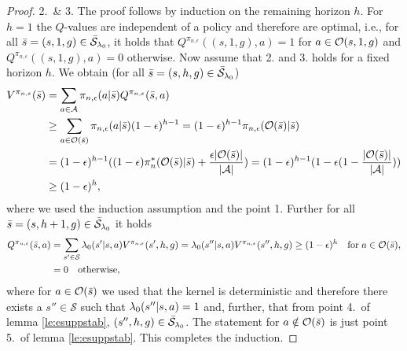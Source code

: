 \begin{proof}
2.\ \& 3.
The proof follows by induction on the remaining horizon $h$.
For $h=1$ the $Q$-values are independent of a policy
and therefore are optimal, i.e., for all 
$\bar{s} = (s,1,g) \in \bar{\mathcal{S}}_{\mathit{\lambda}_0}$, it holds that
$Q^{\pi_{n,\epsilon}}((s,1,g),a) = 1$ for $a\in \mathcal{O}(s,1,g)$
and $Q^{\pi_{n,\epsilon}}((s,1,g),a) = 0$ otherwise.
Now assume that 2. and 3. holds for a fixed horizon $h$.
We obtain (for all $\bar{s} = (s,h,g) \in \bar{\mathcal{S}}_{\mathit{\lambda}_0}$)
\begin{align*}
V^{\pi_{n,\epsilon}}(\bar{s})
&=
\sum_{a\in \mathcal{A}} \pi_{n,\epsilon}(a|\bar{s})
Q^{\pi_{n,\epsilon}}(\bar{s},a)
\\
&\geq
\sum_{a\in \mathcal{O}(\bar{s})} \pi_{n,\epsilon}(a|\bar{s})
(1-\epsilon)^{h-1}
=
(1-\epsilon)^{h-1} \pi_{n,\epsilon}(\mathcal{O}(\bar{s})|\bar{s})
\\
&=
(1-\epsilon)^{h-1} ((1-\epsilon) \pi_n^*(\mathcal{O}(\bar{s})|\bar{s})
+\frac{\epsilon |\mathcal{O}(\bar{s})|}{|\mathcal{A}|})
=
(1-\epsilon)^{h-1} (1-\epsilon(1-\frac{|\mathcal{O}(\bar{s})|}{|\mathcal{A}|}) )
\\
&\geq
(1-\epsilon)^{h},
\end{align*}
where we used the induction assumption and the point 1.
Further for all $\bar{s} = (s,h+1,g) \in \bar{\mathcal{S}}_{\mathit{\lambda}_0}$ it holds
\begin{align*}
Q^{\pi_{n,\epsilon}}(\bar{s},a)
&=
\sum_{s'\in \mathcal{S}} \mathit{\lambda}_0(s'|s,a)
V^{\pi_{n,\epsilon}}(s',h,g)
=
\mathit{\lambda}_0(s''|s,a)
V^{\pi_{n,\epsilon}}(s'',h,g) \geq (1-\epsilon)^{h} \quad \text{for}\; a \in \mathcal{O}(\bar{s}),
\\
&= 0 \quad \text{otherwise,}
\end{align*}
where for $a\in \mathcal{O}(\bar{s})$ we used that the kernel
is deterministic and therefore there exists a $s'' \in \mathcal{S}$
such that $\mathit{\lambda}_0(s''|s,a)=1$ and, further, that from point 4.\ of lemma
\ref{le:esuppstab}, $(s'',h,g) \in \bar{\mathcal{S}}_{\mathit{\lambda}_0}$.
The statement for $a\notin \mathcal{O}(\bar{s})$ is just point 5.\ of lemma \ref{le:esuppstab}.
This completes the induction.
\end{proof}

